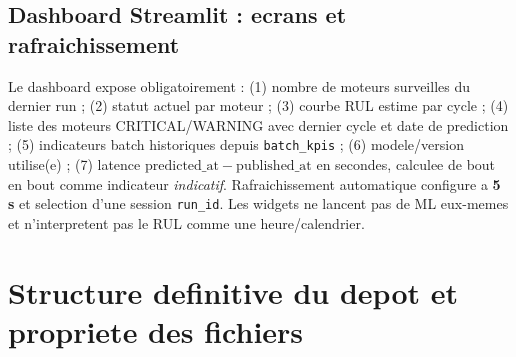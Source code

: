 \documentclass[10pt,a4paper]{article}
\newcommand{\code}[1]{{\small\ttfamily\nolinkurl{#1}}}
\begin{document}
\subsection{Dashboard Streamlit : ecrans et rafraichissement}
Le dashboard expose obligatoirement : (1) nombre de moteurs surveilles du dernier run ; (2) statut actuel par moteur ; (3) courbe RUL estime par cycle ; (4) liste des moteurs CRITICAL/WARNING avec dernier cycle et date de prediction ; (5) indicateurs batch historiques depuis \code{batch_kpis} ; (6) modele/version utilise(e) ; (7) latence \(\mathrm{predicted\_at}-\mathrm{published\_at}\) en secondes, calculee de bout en bout comme indicateur \emph{indicatif}. Rafraichissement automatique configure a \textbf{5 s} et selection d'une session \code{run_id}. Les widgets ne lancent pas de ML eux-memes et n'interpretent pas le RUL comme une heure/calendrier.

\section{Structure definitive du depot et propriete des fichiers}
\end{document}

